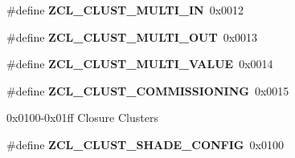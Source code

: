 \begin{DoxyCompactItemize}
\item 
\hypertarget{group__zcl_ga0c54d0abb514bdb233c389d6608bb6f7}{\#define {\bfseries Z\-C\-L\-\_\-\-C\-L\-U\-S\-T\-\_\-\-M\-U\-L\-T\-I\-\_\-\-I\-N}~0x0012}\label{group__zcl_ga0c54d0abb514bdb233c389d6608bb6f7}

\item 
\hypertarget{group__zcl_ga9dbb3e0eb48f6d263eb57ed8a3c8343a}{\#define {\bfseries Z\-C\-L\-\_\-\-C\-L\-U\-S\-T\-\_\-\-M\-U\-L\-T\-I\-\_\-\-O\-U\-T}~0x0013}\label{group__zcl_ga9dbb3e0eb48f6d263eb57ed8a3c8343a}

\item 
\hypertarget{group__zcl_gaeeda9501abc7a193da0708cbbb08cc84}{\#define {\bfseries Z\-C\-L\-\_\-\-C\-L\-U\-S\-T\-\_\-\-M\-U\-L\-T\-I\-\_\-\-V\-A\-L\-U\-E}~0x0014}\label{group__zcl_gaeeda9501abc7a193da0708cbbb08cc84}

\item 
\hypertarget{group__zcl_ga547cd138961d72d75ec09224e7777ed7}{\#define {\bfseries Z\-C\-L\-\_\-\-C\-L\-U\-S\-T\-\_\-\-C\-O\-M\-M\-I\-S\-S\-I\-O\-N\-I\-N\-G}~0x0015}\label{group__zcl_ga547cd138961d72d75ec09224e7777ed7}

\end{DoxyCompactItemize}
\label{_amgrp01747264fe7bf50731df0522c351974e}%
0x0100-\/0x01ff Closure Clusters \begin{DoxyCompactItemize}
\item 
\hypertarget{group__zcl_ga72f0565da3072ed47f56ba4a5f21ab65}{\#define {\bfseries Z\-C\-L\-\_\-\-C\-L\-U\-S\-T\-\_\-\-S\-H\-A\-D\-E\-\_\-\-C\-O\-N\-F\-I\-G}~0x0100}\label{group__zcl_ga72f0565da3072ed47f56ba4a5f21ab65}

\end{DoxyCompactItemize}
\label{_amgrp01747264fe7bf50731df0522c351974e}%
